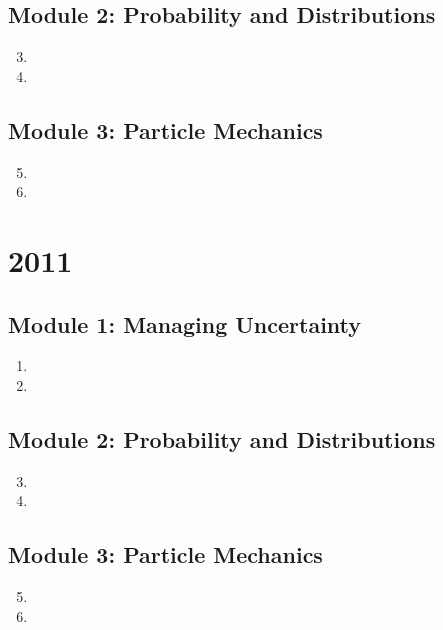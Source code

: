 \documentclass{solutionsmannual}
\begin{document}
\section{Module 2: Probability and Distributions}
\begin{enumerate}[label=\bfseries  \arabic*.]\setcounter{enumi}{2}
\item 
\item 
\end{enumerate}
\section{Module 3: Particle Mechanics}
\begin{enumerate}[label=\bfseries  \arabic*.]\setcounter{enumi}{4}
\item 
\item 
\end{enumerate}

\chapter{2011}
\section{Module 1: Managing Uncertainty}
\begin{enumerate}[label=\bfseries  \arabic*.]\setcounter{enumi}{0}
\item 
\item 
\end{enumerate}
\section{Module 2: Probability and Distributions}
\begin{enumerate}[label=\bfseries  \arabic*.]\setcounter{enumi}{2}
\item 
\item 
\end{enumerate}
\section{Module 3: Particle Mechanics}
\begin{enumerate}[label=\bfseries  \arabic*.]\setcounter{enumi}{4}
\item 
\item 
\end{enumerate}
\end{document}
